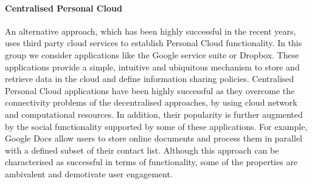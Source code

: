 \paragraph*{Centralised Personal Cloud}

An alternative approach, which has been highly successful in the recent years,
uses third party cloud services to establish Personal Cloud functionality.  In
this group we consider applications like the Google service suite or Dropbox.
These applications provide a simple, intuitive and ubiquitous mechanism to
store and retrieve data in the cloud and define information sharing policies.
Centralised Personal Cloud applications have been highly successful as they
overcome the connectivity problems of the decentralised approaches, by using
cloud network and computational resources. In addition, their popularity is
further augmented by the social functionality supported by some of these
applications. For example, Google Docs allow users to store online documents and
process them in parallel with a defined subset of their contact list.  Although
this approach can be characterised as successful in terms of functionality, some
of the properties are ambivalent and demotivate user engagement. 

